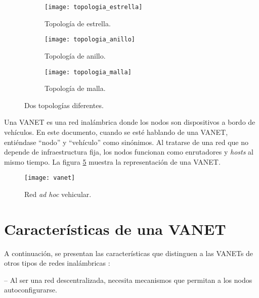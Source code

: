 \begin{figure}[th]
\centering

\begin{subfigure}[b]{0.45\textwidth}
\centering
\texttt{[image: topologia\_estrella]}
\caption[Topología de estrella.]{Topología de estrella.}
\label{fig:topologia_estrella}
\end{subfigure}
\hfill
\begin{subfigure}[b]{0.45\textwidth}
\centering
\texttt{[image: topologia\_anillo]}
\caption[Topología de anillo]{Topología de anillo.}
\label{fig:topologia_anillo}
\end{subfigure}
\hfill
\begin{subfigure}[b]{0.45\textwidth}
\centering
\texttt{[image: topologia\_malla]}
\caption[Topología de malla]{Topología de malla.}
\label{fig:topologia_malla}
\end{subfigure}

\decoRule
\caption[Dos topologías diferentes]{Dos topologías diferentes.}
\label{fig:topologias}
\end{figure}

Una VANET es una red inalámbrica donde los nodos son dispositivos a bordo de
vehículos. En este documento, cuando se esté hablando de una VANET, entiéndase
``nodo'' y ``vehículo'' como sinónimos. Al tratarse de una red que no depende de
infraestructura fija, los nodos funcionan como enrutadores y \textit{hosts} al
mismo tiempo. La figura \ref{fig:vanet} muestra la representación de una VANET.

\begin{figure}[th]
\centering
\texttt{[image: vanet]}
\decoRule
\caption[Red \textit{ad hoc} vehicular]{Red \textit{ad hoc} vehicular.}
\label{fig:vanet}
\end{figure}

\section{Características de una VANET}

\label{sec:caracteristicas_de_una_vanet}

A continuación, se presentan las características que distinguen a las VANETs de
otros tipos de redes inalámbricas \cite{Meneguette2018}:

 -- Al ser una red descentralizada, necesita
mecanismos que permitan a los nodos autoconfigurarse.

